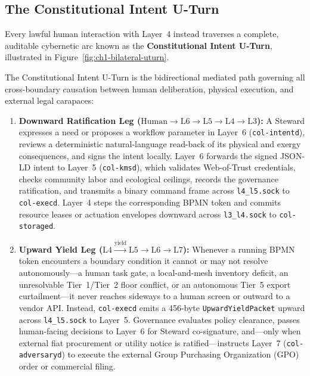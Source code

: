 \subsection{The Constitutional Intent U-Turn}

Every lawful human interaction with Layer~4 instead traverses a complete, auditable
cybernetic arc known as the \textbf{Constitutional Intent U-Turn}, illustrated in
Figure~\ref{fig:ch1-bilateral-uturn}.

\begin{definition}
\label{def:ch1-intent-uturn}
The Constitutional Intent U-Turn is the bidirectional mediated path governing all
cross-boundary causation between human deliberation, physical execution, and external legal
carapaces:
\begin{enumerate}
\item \textbf{Downward Ratification Leg ($\mathrm{Human} \to \mathrm{L6} \to \mathrm{L5} \to \mathrm{L4} \to \mathrm{L3}$):}
        A Steward expresses a need or proposes a workflow parameter in Layer~6
        (\texttt{col-intentd}), reviews a deterministic natural-language read-back of its
        physical and exergy consequences, and signs the intent locally. Layer~6 forwards the
        signed JSON-LD intent to Layer~5 (\texttt{col-kmsd}), which validates Web-of-Trust
        credentials, checks community labor and ecological ceilings, records the governance
        ratification, and transmits a binary command frame across \texttt{l4\_l5.sock} to
        \texttt{col-execd}. Layer~4 steps the corresponding BPMN token and commits resource
        leases or actuation envelopes downward across \texttt{l3\_l4.sock} to
        \texttt{col-storaged}.
\item \textbf{Upward Yield Leg ($\mathrm{L4} \xrightarrow{\text{yield}} \mathrm{L5} \to \mathrm{L6} \to \mathrm{L7}$):}
        Whenever a running BPMN token encounters a boundary condition it cannot or may not
        resolve autonomously---a human task gate, a local-and-mesh inventory deficit, an
        unresolvable Tier~1/Tier~2 floor conflict, or an autonomous Tier~5 export
        curtailment---it never reaches sideways to a human screen or outward to a vendor
        API. Instead, \texttt{col-execd} emits a 456-byte \texttt{UpwardYieldPacket} upward
        across \texttt{l4\_l5.sock} to Layer~5. Governance evaluates policy clearance,
        passes human-facing decisions to Layer~6 for Steward co-signature, and---only when
        external fiat procurement or utility notice is ratified---instructs Layer~7
        (\texttt{col-adversaryd}) to execute the external Group Purchasing Organization
        (GPO) order or commercial filing.
\end{enumerate}
\end{definition}

